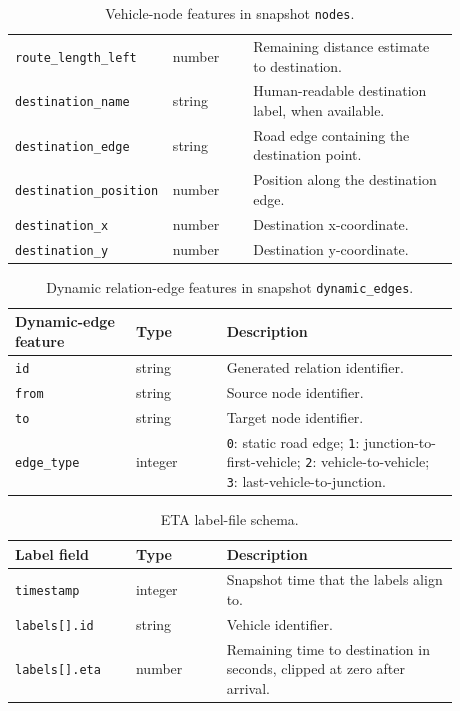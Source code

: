 \begin{table}[!htbp]
\begin{tabular}{p{0.24\linewidth}p{0.18\linewidth}p{0.46\linewidth}}
\texttt{route\_length\_left} & number & Remaining distance estimate to destination. \\
\texttt{destination\_name} & string & Human-readable destination label, when available. \\
\texttt{destination\_edge} & string & Road edge containing the destination point. \\
\texttt{destination\_position} & number & Position along the destination edge. \\
\texttt{destination\_x} & number & Destination x-coordinate. \\
\texttt{destination\_y} & number & Destination y-coordinate. \\
\bottomrule
\end{tabular}
\caption{Vehicle-node features in snapshot \texttt{nodes}.}
\label{tab:vehicle_features}
\end{table}

\begin{table}[!htbp]
\centering
\scriptsize
\begin{tabular}{p{0.24\linewidth}p{0.18\linewidth}p{0.46\linewidth}}
\toprule
\textbf{Dynamic-edge feature} & \textbf{Type} & \textbf{Description} \\
\midrule
\texttt{id} & string & Generated relation identifier. \\
\texttt{from} & string & Source node identifier. \\
\texttt{to} & string & Target node identifier. \\
\texttt{edge\_type} & integer & \texttt{0}: static road edge; \texttt{1}: junction-to-first-vehicle; \texttt{2}: vehicle-to-vehicle; \texttt{3}: last-vehicle-to-junction. \\
\bottomrule
\end{tabular}
\caption{Dynamic relation-edge features in snapshot \texttt{dynamic\_edges}.}
\label{tab:dynamic_edge_features}
\end{table}

\begin{table}[!htbp]
\centering
\scriptsize
\begin{tabular}{p{0.24\linewidth}p{0.18\linewidth}p{0.46\linewidth}}
\toprule
\textbf{Label field} & \textbf{Type} & \textbf{Description} \\
\midrule
\texttt{timestamp} & integer & Snapshot time that the labels align to. \\
\texttt{labels[].id} & string & Vehicle identifier. \\
\texttt{labels[].eta} & number & Remaining time to destination in seconds, clipped at zero after arrival. \\
\bottomrule
\end{tabular}
\caption{ETA label-file schema.}
\label{tab:label_features}
\end{table}

